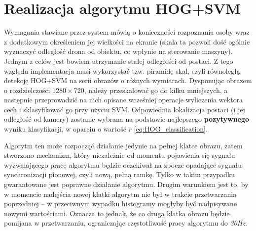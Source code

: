 

\section{Realizacja algorytmu HOG+SVM}


Wymagania stawiane przez system mówią o konieczności rozpoznania osoby wraz z dodatkowym określeniem jej wielkości na ekranie (skala ta pozwoli dość ogólnie wyznaczyć odległość drona od obiektu, co wpłynie na sterowanie maszyny). Jednym z celów jest bowiem utrzymanie stałej odległości od postaci. %
Z tego względu implementacja musi wykorzystać tzw. piramidę skal, czyli równoległą detekcję HOG+SVM na serii obrazów o różnych wymiarach. %
Dysponując obrazem o rozdzielczości $1280 \times720$, należy przeskalować go do kilku mniejszych, a następnie przeprowadzić na nich opisane wcześniej operacje wyliczenia wektora cech i sklasyfikować go przy użyciu SVM. 
Odpowiednia lokalizacja postaci (i jej odległość od kamery) zostanie wybrana na podstawie najlepszego \textbf{pozytywnego} wyniku klasyfikacji, w oparciu o wartość $r$ \eqref{eq:HOG_classification}. %

Algorytm ten może rozpocząć działanie jedynie na pełnej klatce obrazu, zatem stworzono mechanizm, który niezależnie od momentu pojawienia się sygnału wyzwalającego pracę algorytmu będzie oczekiwał na zbocze opadające sygnału synchronizacji pionowej, czyli nową, pełną ramkę. Tylko w takim przypadku gwarantowane jest poprawne działanie algorytmu. %
Drugim warunkiem jest to, by w momencie nadejścia nowej klatki algorytm nie był w trakcie przetwarzania poprzedniej -- w przeciwnym wypadku histogramy mogłyby być nadpisywane nowymi wartościami. 
Oznacza to jednak, że co druga klatka obrazu będzie pomijana w przetwarzaniu, ograniczając częstotliwość pracy algorytmu do \textit{30Hz}.

